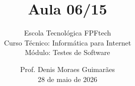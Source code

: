 
\title{Aula 06/15}

\subtitle{
\vspace{1.0cm}
Escola Tecnológica FPFtech\\
\vspace{0.5cm}
Curso Técnico: Informática para Internet\\
\vspace{0.5cm}
Módulo: Testes de Software
\vspace{1.0cm}
}

\author{
Prof. Denis Moraes Guimarães\\
\small 28 de maio de 2026
}

\date{}